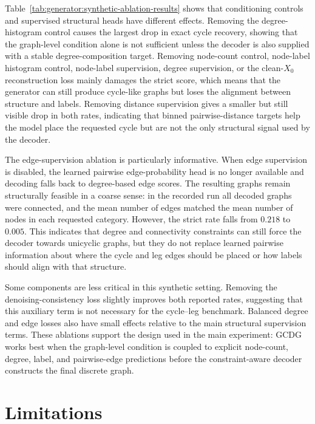 Table~\ref{tab:generator:synthetic-ablation-results} shows that conditioning
controls and supervised structural heads have different effects. Removing the
degree-histogram control causes the largest drop in exact cycle recovery,
showing that the graph-level condition alone is not sufficient unless the
decoder is also supplied with a stable degree-composition target. Removing
node-count control, node-label histogram control, node-label supervision,
degree supervision, or the clean-\(X_0\) reconstruction loss mainly damages the
strict score, which means that the generator can still produce cycle-like
graphs but loses the alignment between structure and labels.
Removing distance supervision gives a smaller but still visible drop in both
rates, indicating that binned pairwise-distance targets help the model place
the requested cycle but are not the only structural signal used by the decoder.

The edge-supervision ablation is particularly informative. When edge
supervision is disabled, the learned pairwise edge-probability head is no
longer available and decoding falls back to degree-based edge scores. The
resulting graphs remain structurally feasible in a coarse sense: in the
recorded run all decoded graphs were connected, and the mean number of edges
matched the mean number of nodes in each requested category. However, the strict
rate falls from \(0.218\) to \(0.005\). This indicates that degree and
connectivity constraints can still force the decoder towards unicyclic graphs,
but they do not replace learned pairwise information about where the cycle and
leg edges should be placed or how labels should align with that structure.

Some components are less critical in this synthetic setting. Removing the
denoising-consistency loss slightly improves both reported rates, suggesting
that this auxiliary term is not necessary for the cycle--leg benchmark. Balanced
degree and edge losses also have small effects relative to the main structural
supervision terms. These ablations support the design used in the main
experiment: GCDG works best when the graph-level condition is coupled to
explicit node-count, degree, label, and pairwise-edge predictions before the
constraint-aware decoder constructs the final discrete graph.

\section{Limitations}
\label{sec:generator:limitations}

